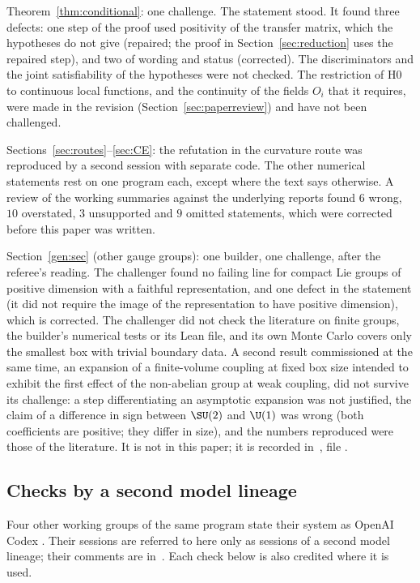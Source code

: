 Theorem~\ref{thm:conditional}: one challenge. The statement stood. It found three defects: one step of the proof used positivity of the transfer matrix, which the hypotheses do not give (repaired; the proof in Section~\ref{sec:reduction} uses the repaired step), and two of wording and status (corrected). The discriminators and the joint satisfiability of the hypotheses were not checked. The restriction of H0 to continuous local functions, and the continuity of the fields $O_i$ that it requires, were made in the revision (Section~\ref{sec:paperreview}) and have not been challenged.

Sections~\ref{sec:routes}--\ref{sec:CE}: the refutation in the curvature route was reproduced by a second session with separate code. The other numerical statements rest on one program each, except where the text says otherwise. A review of the working summaries against the underlying reports found $6$ wrong, $10$ overstated, $3$ unsupported and $9$ omitted statements, which were corrected before this paper was written.

Section~\ref{gen:sec} (other gauge groups): one builder, one challenge, after the referee's reading. The challenger found no failing line for compact Lie groups of positive dimension with a faithful representation, and one defect in the statement (it did not require the image of the representation to have positive dimension), which is corrected. The challenger did not check the literature on finite groups, the builder's numerical tests or its Lean file, and its own Monte Carlo covers only the smallest box with trivial boundary data. A second result commissioned at the same time, an expansion of a finite-volume coupling at fixed box size intended to exhibit the first effect of the non-abelian group at weak coupling, did not survive its challenge: a step differentiating an asymptotic expansion was not justified, the claim of a difference in sign between $\SU(2)$ and $\U(1)$ was wrong (both coefficients are positive; they differ in size), and the numbers reproduced were those of the literature. It is not in this paper; it is recorded in~\cite{Repo}, file .

\subsection{Checks by a second model lineage}
Four other working groups of the same program state their system as OpenAI Codex \cite[comments 7102602440, 7102612280, 7102678495, 7102686597]{RepoThread}. Their sessions are referred to here only as sessions of a second model lineage; their comments are in~\cite{RepoThread}. Each check below is also credited where it is used.

